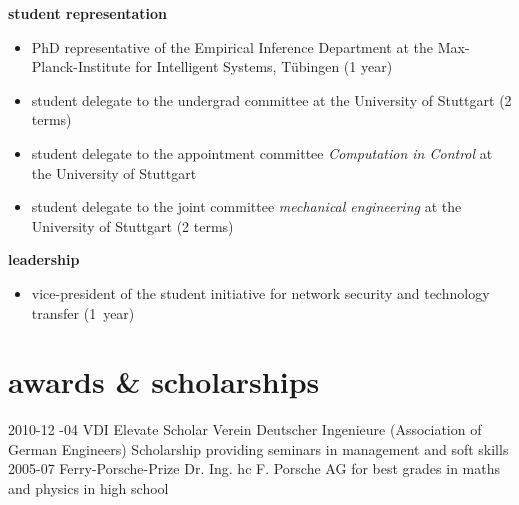 \documentclass[]{k-cv} %
\begin{document}
{\Large \bfseries student representation}
\begin{itemize}
 \item PhD representative of the Empirical Inference Department at the
Max-Planck-Institute for Intelligent Systems, T\"ubingen (1 year)
 \item student delegate to the undergrad committee at the University of
Stuttgart (2 terms)
\item student delegate to the appointment committee \emph{Computation in
Control} at the University of Stuttgart
\item student delegate to the joint committee \emph{mechanical engineering} at
the University of Stuttgart (2 terms)
\end{itemize}

{\Large \bfseries leadership}
\begin{itemize}
 \item vice-president of the student initiative for network security and
technology transfer (1~year)
\end{itemize}


\section{awards \& scholarships}\normalfont

\begin{entrylist}
\entry
{2010-12 -04}
{VDI Elevate Scholar}
{Verein Deutscher Ingenieure (Association of German Engineers)}
{Scholarship providing seminars in management and soft skills}
\entry
{2005-07}
{Ferry-Porsche-Prize}
{Dr. Ing. hc F. Porsche AG}
{for best grades in maths and physics in high school}
\end{entrylist}
\end{document}
